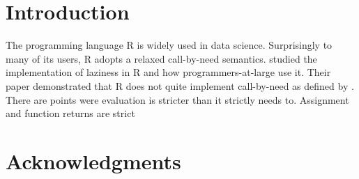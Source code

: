 \documentclass[screen,acmsmall]{acmart}
\begin{document}


\maketitle
\section{Introduction}

The programming language R is widely used in data science. Surprisingly to many
of its users, R adopts a relaxed call-by-need semantics. \citet{oopsla19b}
studied the implementation of laziness in R and how programmers-at-large use it.
Their paper demonstrated that R does not quite implement call-by-need as defined
by \citet{hudak89}. There are points were evaluation is stricter than it
strictly needs to. Assignment and function returns are strict



\section*{Acknowledgments}

\end{document}
